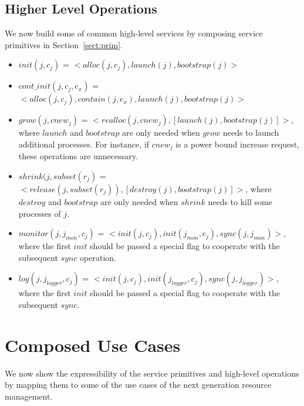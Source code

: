 \documentclass[10pt]{article}
\begin{document}
\subsection{Higher Level Operations}
\label{sect:hiop}
We now build some of common high-level services 
by composing service primitives in Section~\ref{sect:prim}.

\begin{itemize}

\item{$init(j, c_j)$ = $<alloc(j, c_j), launch(j), bootstrap(j)>$} 

\item{$cont\_init(j, c_j, e_x)$ = $< alloc(j, c_j), contain(j, e_x), launch(j), bootstrap(j) >$} 

\item{$grow(j, cnew_j)$ = $<realloc(j, cnew_j), [launch(j), bootstrap(j)]>$,  where $launch$ and $bootstrap$ are only needed when $grow$ needs to launch additional processes. For instance, if $cnew_j$ is a power bound increase request, these operations are unnecessary.} 

\item{$shrink(j,subset(r_j)$ = $<release(j, subset(r_j)), [destroy(j), bootstrap(j)]>$, where $destroy$ and $bootstrap$ are only needed when $shrink$ needs to kill some processes of $j$.}

\item{$monitor(j, j_{mon}, c_j)$ = $<init(j, c_j), init(j_{mon}, c_j), sync(j, j_{mon})>$, where the first $init$ should be passed a special flag to cooperate with the subsequent $sync$ operation.} 

\item{$log(j, j_{logger}, c_j)$ = $<init(j, c_j), init(j_{logger}, c_j), sync(j, j_{logger})>$, where the first $init$ should be passed a special flag to cooperate with the subsequent $sync$.} 

\end{itemize} 

\section{Composed Use Cases}
We now show the expressibility of the service primitives and 
high-level operations by mapping them to some of the
use cases of the next generation resource management.
\end{document}
